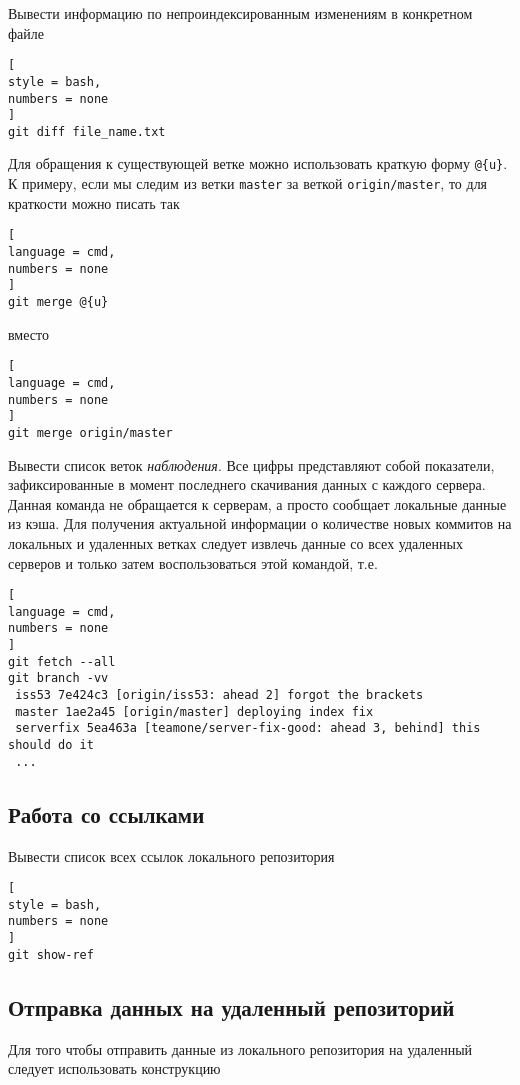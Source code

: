 \documentclass[%
	11pt,
	a4paper,
	utf8,
		]{article}
\begin{document}
Вывести информацию по непроиндексированным изменениям в конкретном файле
\begin{lstlisting}[
style = bash,
numbers = none
]
git diff file_name.txt
\end{lstlisting}

Для обращения к существующей ветке можно использовать краткую форму \texttt{@\{u\}}. К примеру, если мы следим из ветки \texttt{master} за веткой \texttt{origin/master}, то для краткости можно писать так

\begin{lstlisting}[
language = cmd,
numbers = none
]
git merge @{u}
\end{lstlisting}
вместо
\begin{lstlisting}[
language = cmd,
numbers = none
]
git merge origin/master
\end{lstlisting}

Вывести список веток \emph{наблюдения}. Все цифры представляют собой показатели, зафиксированные в момент последнего скачивания данных с каждого сервера. Данная команда не обращается к серверам, а просто сообщает локальные данные из кэша. Для получения актуальной информации о количестве новых коммитов на локальных и удаленных ветках следует извлечь данные со всех удаленных серверов и только затем воспользоваться этой командой, т.е.
\begin{lstlisting}[
language = cmd,
numbers = none
]
git fetch --all
git branch -vv
 iss53 7e424c3 [origin/iss53: ahead 2] forgot the brackets
 master 1ae2a45 [origin/master] deploying index fix
 serverfix 5ea463a [teamone/server-fix-good: ahead 3, behind] this should do it
 ...
\end{lstlisting} 

\subsection{Работа со ссылками}

Вывести список всех ссылок локального репозитория
\begin{lstlisting}[
style = bash,
numbers = none
]
git show-ref
\end{lstlisting}


\subsection{Отправка данных на удаленный репозиторий}

Для того чтобы отправить данные из локального репозитория на удаленный следует использовать конструкцию
\end{document}
